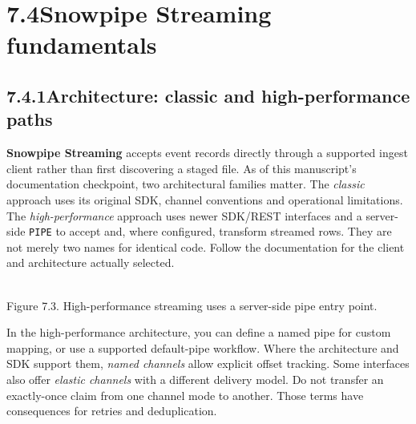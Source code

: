 \documentclass[11pt,twoside]{article}
\newcommand{\topic}[2]{\subsection*{#1\quad #2}}
\begin{document}
\section*{7.4\quad Snowpipe Streaming fundamentals}
\topic{7.4.1}{Architecture: classic and high-performance paths}
\textbf{Snowpipe Streaming} accepts event records directly through a supported ingest client rather than first discovering a staged file. As of this manuscript's documentation checkpoint, two architectural families matter. The \emph{classic} approach uses its original SDK, channel conventions and operational limitations. The \emph{high-performance} approach uses newer SDK/REST interfaces and a server-side \texttt{PIPE} to accept and, where configured, transform streamed rows. They are not merely two names for identical code. Follow the documentation for the client and architecture actually selected.
\begin{center}\\{\fontsize{8}{9.2}\selectfont\color{inkgray}Figure 7.3. High-performance streaming uses a server-side pipe entry point.}\end{center}
In the high-performance architecture, you can define a named pipe for custom mapping, or use a supported default-pipe workflow. Where the architecture and SDK support them, \emph{named channels} allow explicit offset tracking. Some interfaces also offer \emph{elastic channels} with a different delivery model. Do not transfer an exactly-once claim from one channel mode to another. Those terms have consequences for retries and deduplication.
\end{document}
